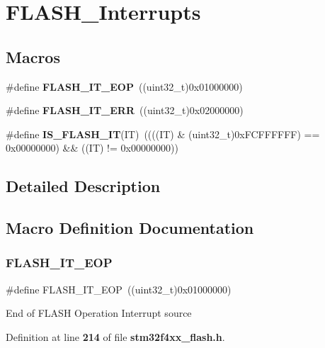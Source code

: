 \section{F\+L\+A\+S\+H\+\_\+\+Interrupts}
\label{group__FLASH__Interrupts}
\subsection*{Macros}
\begin{DoxyCompactItemize}
\item 
\#define \textbf{ F\+L\+A\+S\+H\+\_\+\+I\+T\+\_\+\+E\+OP}~((uint32\+\_\+t)0x01000000)
\item 
\#define \textbf{ F\+L\+A\+S\+H\+\_\+\+I\+T\+\_\+\+E\+RR}~((uint32\+\_\+t)0x02000000)
\item 
\#define \textbf{ I\+S\+\_\+\+F\+L\+A\+S\+H\+\_\+\+IT}(IT)~((((IT) \& (uint32\+\_\+t)0x\+F\+C\+F\+F\+F\+F\+F\+F) == 0x00000000) \&\& ((\+I\+T) != 0x00000000))
\end{DoxyCompactItemize}


\subsection{Detailed Description}


\subsection{Macro Definition Documentation}
\mbox{\label{group__FLASH__Interrupts_gaea20e80e1806d58a7544cfe8659e7f11}} 
\subsubsection{F\+L\+A\+S\+H\+\_\+\+I\+T\+\_\+\+E\+OP}
{\footnotesize\ttfamily \#define F\+L\+A\+S\+H\+\_\+\+I\+T\+\_\+\+E\+OP~((uint32\+\_\+t)0x01000000)}

End of F\+L\+A\+SH Operation Interrupt source 

Definition at line \textbf{ 214} of file \textbf{ stm32f4xx\+\_\+flash.\+h}.

\mbox{\label{group__FLASH__Interrupts_ga4e2c23ab8c1b9a5ee49bf6d695d9ae8c}} 
